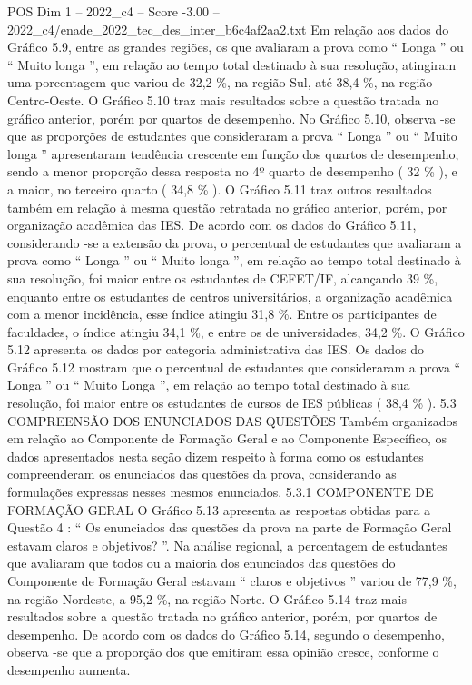 \begin{textsample}{POS Dim 1 – 2022\_c4 – Score -3.00 – 2022\_c4/enade\_2022\_tec\_des\_inter\_b6c4af2aa2.txt}
Em relação aos dados do Gráfico 5.9, entre as grandes regiões, os que avaliaram a prova como “ Longa ” ou “ Muito longa ”, em relação ao tempo total destinado à sua resolução, atingiram uma porcentagem que variou de 32,2 \%, na região Sul, até 38,4 \%, na região Centro-Oeste.
O Gráfico 5.10 traz mais resultados sobre a questão tratada no gráfico anterior, porém por quartos de desempenho.
No Gráfico 5.10, observa -se que as proporções de estudantes que consideraram a prova “ Longa ” ou “ Muito longa ” apresentaram tendência crescente em função dos quartos de desempenho, sendo a menor proporção dessa resposta no 4º quarto de desempenho ( 32 \% ), e a maior, no terceiro quarto ( 34,8 \% ).
O Gráfico 5.11 traz outros resultados também em relação à mesma questão retratada no gráfico anterior, porém, por organização acadêmica das IES.
De acordo com os dados do Gráfico 5.11, considerando -se a extensão da prova, o percentual de estudantes que avaliaram a prova como “ Longa ” ou “ Muito longa ”, em relação ao tempo total destinado à sua resolução, foi maior entre os estudantes de CEFET/IF, alcançando 39 \%, enquanto entre os estudantes de centros universitários, a organização acadêmica com a menor incidência, esse índice atingiu 31,8 \%.
Entre os participantes de faculdades, o índice atingiu 34,1 \%, e entre os de universidades, 34,2 \%.
O Gráfico 5.12 apresenta os dados por categoria administrativa das IES.
Os dados do Gráfico 5.12 mostram que o percentual de estudantes que consideraram a prova “ Longa ” ou “ Muito Longa ”, em relação ao tempo total destinado à sua resolução, foi maior entre os estudantes de cursos de IES públicas ( 38,4 \% ). 5.3 COMPREENSÃO DOS ENUNCIADOS DAS QUESTÕES Também organizados em relação ao Componente de Formação Geral e ao Componente Específico, os dados apresentados nesta seção dizem respeito à forma como os estudantes compreenderam os enunciados das questões da prova, considerando as formulações expressas nesses mesmos enunciados. 5.3.1 COMPONENTE DE FORMAÇÃO GERAL O Gráfico 5.13 apresenta as respostas obtidas para a Questão 4 : “ Os enunciados das questões da prova na parte de Formação Geral estavam claros e objetivos? ”.
Na análise regional, a percentagem de estudantes que avaliaram que todos ou a maioria dos enunciados das questões do Componente de Formação Geral estavam “ claros e objetivos ” variou de 77,9 \%, na região Nordeste, a 95,2 \%, na região Norte.
O Gráfico 5.14 traz mais resultados sobre a questão tratada no gráfico anterior, porém, por quartos de desempenho.
De acordo com os dados do Gráfico 5.14, segundo o desempenho, observa -se que a proporção dos que emitiram essa opinião cresce, conforme o desempenho aumenta.

\end{textsample}
